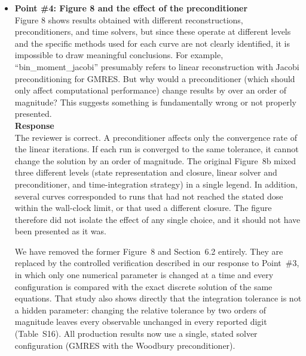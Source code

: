 \documentclass{article}
\newif\ifshowauthornotes
\newcommand{\authornote}[1]{\ifshowauthornotes{\color{red}\ [\textbf{Author action:} #1]}\fi}
\begin{document}
\begin{itemize}
\authornote{If possible, add at least one fusion-spectrum (He/dpa $\sim$10) comparison of the Case~1 reduction against the dynamic (non-reduced) helium treatment on a small domain. That is the specific gap Reviewer~\#2 will look for on re-review.}

\item \textbf{Point \#4: Figure 8 and the effect of the preconditioner}\\
Figure 8 shows results obtained with different reconstructions, preconditioners, and time solvers, but since these operate at different levels and the specific methods used for each curve are not clearly identified, it is impossible to draw meaningful conclusions. For example, ``bin\_moment\_jacobi'' presumably refers to linear reconstruction with Jacobi preconditioning for GMRES. But why would a preconditioner (which should only affect computational performance) change results by over an order of magnitude? This suggests something is fundamentally wrong or not properly presented.\\

\textbf{Response}\\
The reviewer is correct. A preconditioner affects only the convergence rate of the linear iterations. If each run is converged to the same tolerance, it cannot change the solution by an order of magnitude. The original Figure~8b mixed three different levels (state representation and closure, linear solver and preconditioner, and time-integration strategy) in a single legend. In addition, several curves corresponded to runs that had not reached the stated dose within the wall-clock limit, or that used a different closure. The figure therefore did not isolate the effect of any single choice, and it should not have been presented as it was.

\authornote{Confirm the actual cause of the order-of-magnitude difference in the ``bin\_moment\_jacobi'' curve (e.g., piecewise-constant closure, unconverged/timed-out run, loose tolerance, or a different $i_{\rm mobile}$) and state it here in one sentence.}

We have removed the former Figure~8 and Section~6.2 entirely. They are replaced by the controlled verification described in our response to Point~\#3, in which only one numerical parameter is changed at a time and every configuration is compared with the exact discrete solution of the same equations. That study also shows directly that the integration tolerance is not a hidden parameter: changing the relative tolerance by two orders of magnitude leaves every observable unchanged in every reported digit (Table~S16). All production results now use a single, stated solver configuration (GMRES with the Woodbury preconditioner).


\end{itemize}
\end{document}
